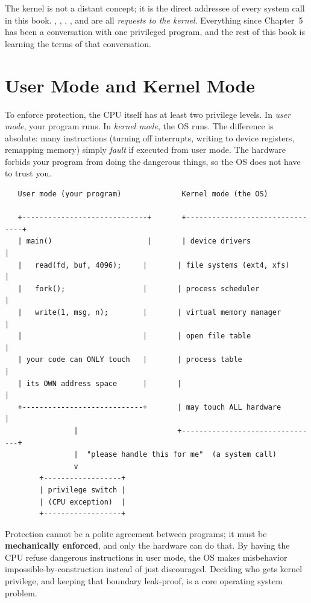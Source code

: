 The kernel is not a distant concept; it is the direct addressee of
every system call in this book. , ,
, , and  are all \emph{requests
to the kernel}. Everything since Chapter~5 has been a conversation
with one privileged program, and the rest of this book is learning
the terms of that conversation.

\section{User Mode and Kernel Mode}

To enforce protection, the CPU itself has at least two privilege
levels. In \emph{user mode}, your program runs. In \emph{kernel mode},
the OS runs. The difference is absolute: many instructions (turning off
interrupts, writing to device registers, remapping memory) simply
\emph{fault} if executed from user mode. The hardware forbids your
program from doing the dangerous things, so the OS does not have to
trust you.

\begin{verbatim}
   User mode (your program)              Kernel mode (the OS)

   +-----------------------------+       +--------------------------------+
   | main()                      |       | device drivers                |
   |   read(fd, buf, 4096);     |       | file systems (ext4, xfs)       |
   |   fork();                  |       | process scheduler             |
   |   write(1, msg, n);        |       | virtual memory manager        |
   |                            |       | open file table               |
   | your code can ONLY touch   |       | process table                 |
   | its OWN address space      |       |                              |
   +----------------------------+       | may touch ALL hardware        |
                |                       +--------------------------------+
                |  "please handle this for me"  (a system call)
                v
        +------------------+
        | privilege switch |
        | (CPU exception)  |
        +------------------+
\end{verbatim}

\begin{osconcept}
Protection cannot be a polite agreement between programs; it must be
\textbf{mechanically enforced}, and only the hardware can do that. By
having the CPU refuse dangerous instructions in user mode, the OS makes
misbehavior impossible-by-construction instead of just discouraged.
Deciding who gets kernel privilege, and keeping that boundary
leak-proof, is a core operating system problem.
\end{osconcept}

